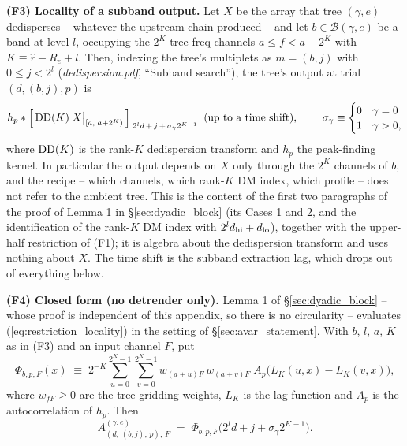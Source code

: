 \documentclass{article}
\numberwithin{equation}{section}   %
\def\DD{{\rm DD}}
\newcommand{\ddnotes}[1]{{\em dedispersion.pdf}, ``#1''}
\begin{document}
\medskip
\par\noindent
{\bf (F3) Locality of a subband output.} Let $X$ be the array that tree $(\gamma,e)$
dedisperses -- whatever the upstream chain produced -- and let $b \in \mathcal{B}(\gamma,e)$
be a band at level $l$, occupying the $2^K$ tree-freq channels $a \le f < a + 2^K$ with
$K \equiv \hat r - R_e + l$. Then, indexing the tree's multiplets as $m = (b,j)$ with
$0 \le j < 2^l$ (\ddnotes{Subband search}), the tree's output at trial $(d,(b,j),p)$ is
\begin{equation}
h_p * \Big[\, \DD(K) \; X\big|_{[a,\;a+2^K)} \,\Big]_{\;2^l d \,+\, j \,+\, \sigma_\gamma 2^{K-1}}
\;\;\mbox{(up to a time shift)},
\hspace{0.8cm} \sigma_\gamma \equiv \begin{cases} 0 & \gamma = 0 \\ 1 & \gamma > 0, \end{cases}
\label{eq:restriction_locality}
\end{equation}
where $\DD(K)$ is the rank-$K$ dedispersion transform and $h_p$ the peak-finding kernel. In
particular the output depends on $X$ only through the $2^K$ channels of $b$, and the recipe --
which channels, which rank-$K$ DM index, which profile -- does not refer to the ambient tree.
This is the content of the first two paragraphs of the proof of Lemma 1 in
\S\ref{sec:dyadic_block} (its Cases 1 and 2, and the identification of the rank-$K$ DM index
with $2^l d_{\rm hi} + d_{\rm lo}$), together with the upper-half restriction of (F1); it is
algebra about the dedispersion transform and uses nothing about $X$. The time shift is the
subband extraction lag, which drops out of everything below.

\medskip
\par\noindent
{\bf (F4) Closed form (no detrender only).} Lemma 1 of \S\ref{sec:dyadic_block} -- whose proof
is independent of this appendix, so there is no circularity -- evaluates
(\ref{eq:restriction_locality}) in the setting of \S\ref{sec:avar_statement}. With $b$, $l$,
$a$, $K$ as in (F3) and an input channel $F$, put
\begin{equation}
\Phi_{b,p,F}(x) \;\equiv\; 2^{-K} \sum_{u=0}^{2^K-1} \sum_{v=0}^{2^K-1}
   w_{(a+u)F} \, w_{(a+v)F} \; A_p\big( L_K(u,x) - L_K(v,x) \big),
\label{eq:restriction_phi}
\end{equation}
where $w_{fF} \ge 0$ are the tree-gridding weights, $L_K$ is the lag function and $A_p$ is the
autocorrelation of $h_p$. Then
\begin{equation}
A^{(\gamma,e)}_{(d,\,(b,j),\,p),\,F} \;=\; \Phi_{b,p,F}\big( 2^l d + j + \sigma_\gamma 2^{K-1} \big).
\label{eq:restriction_closedform}
\end{equation}
\end{document}
